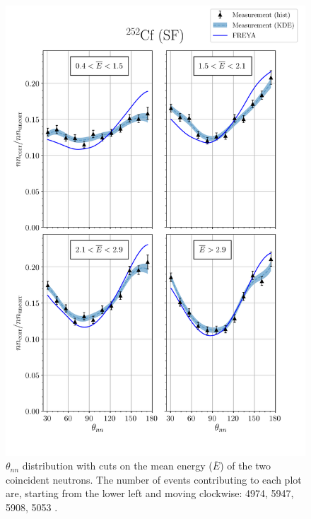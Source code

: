 \begin{figure}
\centering
    \includegraphics[width = \textwidth]{Content/Results/FinalCf252Resultw_freya1KDE.png}
    \caption{$\theta_{nn}$ distribution with cuts on the mean energy ($\overline{E}$) of the two coincident neutrons.
   The number of events contributing to each plot are, starting from the lower left and moving clockwise: 4974, 5947, 5908, 5053 . }
    \label{fig:Cf(1)}
\end{figure}
\FloatBarrier

